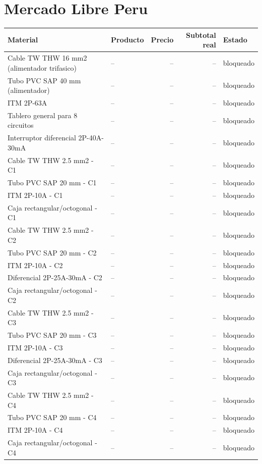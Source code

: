 \documentclass[11pt,a4paper]{article}
\begin{document}
\section{Mercado Libre Peru}
\begin{longtable}{p{} p{} r r p{}}
\toprule Material & Producto & Precio & Subtotal real & Estado \\ \midrule\endhead
Cable TW THW 16 mm2 (alimentador trifasico) & -- & -- & -- & bloqueado \\
Tubo PVC SAP 40 mm (alimentador) & -- & -- & -- & bloqueado \\
ITM 2P-63A & -- & -- & -- & bloqueado \\
Tablero general para 8 circuitos & -- & -- & -- & bloqueado \\
Interruptor diferencial 2P-40A-30mA & -- & -- & -- & bloqueado \\
Cable TW THW 2.5 mm2 - C1 & -- & -- & -- & bloqueado \\
Tubo PVC SAP 20 mm - C1 & -- & -- & -- & bloqueado \\
ITM 2P-10A - C1 & -- & -- & -- & bloqueado \\
Caja rectangular/octogonal - C1 & -- & -- & -- & bloqueado \\
Cable TW THW 2.5 mm2 - C2 & -- & -- & -- & bloqueado \\
Tubo PVC SAP 20 mm - C2 & -- & -- & -- & bloqueado \\
ITM 2P-10A - C2 & -- & -- & -- & bloqueado \\
Diferencial 2P-25A-30mA - C2 & -- & -- & -- & bloqueado \\
Caja rectangular/octogonal - C2 & -- & -- & -- & bloqueado \\
Cable TW THW 2.5 mm2 - C3 & -- & -- & -- & bloqueado \\
Tubo PVC SAP 20 mm - C3 & -- & -- & -- & bloqueado \\
ITM 2P-10A - C3 & -- & -- & -- & bloqueado \\
Diferencial 2P-25A-30mA - C3 & -- & -- & -- & bloqueado \\
Caja rectangular/octogonal - C3 & -- & -- & -- & bloqueado \\
Cable TW THW 2.5 mm2 - C4 & -- & -- & -- & bloqueado \\
Tubo PVC SAP 20 mm - C4 & -- & -- & -- & bloqueado \\
ITM 2P-10A - C4 & -- & -- & -- & bloqueado \\
Caja rectangular/octogonal - C4 & -- & -- & -- & bloqueado \\

\end{longtable}
\end{document}
